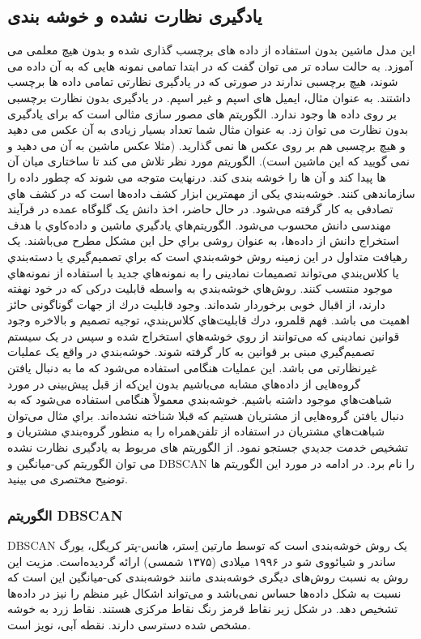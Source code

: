 \documentclass[conference]{IEEEtran}
\begin{document}
        \subsection{ یادگیری نظارت نشده و خوشه بندی   } 
این مدل ماشین بدون استفاده از داده های برچسب گذاری شده و بدون هیچ معلمی می آموزد. به حالت ساده تر می توان گفت که در ابتدا تمامی نمونه هایی که به آن داده می شوند، هیچ برچسبی ندارند در صورتی که در یادگیری نظارتی تمامی داده ها برچسب داشتند. به عنوان مثال، ایمیل های اسپم و غیر اسپم. در یادگیری بدون نظارت برچسبی بر روی داده ها وجود ندارد.
الگوریتم های مصور سازی  مثالی است که برای یادگیری بدون نظارت می توان زد. به عنوان مثال شما تعداد بسیار زیادی به آن عکس می دهید و هیچ برچسبی هم بر روی عکس ها نمی گذارید. (مثلا عکس ماشین به آن می دهید و نمی گویید که این ماشین است). الگوریتم مورد نظر تلاش می کند تا ساختاری میان آن ها پیدا کند و آن ها را خوشه بندی کند. درنهایت متوجه می شوند که چطور داده را سازماندهی کنند.
خوشه‌بندي یکی از مهمترین ابزار کشف داده‌ها است که در کشف هاي تصادفی به کار گرفته می‌شود. در حال حاضر، اخذ دانش یک گلوگاه عمده در فرآیند مهندسی دانش محسوب می‌شود. الگوریتم‌هاي یادگیري ماشین و داده‌کاوي با هدف استخراج دانش از داده‌ها، به عنوان روشی براي حل این مشکل مطرح می‌باشند. یک رهیافت متداول در این زمینه روش خوشه‌بندي است که براي تصمیم‌گیري یا دسته‌بندي یا کلاس‌بندي می‌تواند تصمیمات نمادینی را به نمونه‌هاي جدید با استفاده از نمونه‌هاي موجود منتسب کنند. روش‌هاي خوشه‌بندي به واسطه قابلیت درکی که در خود نهفته دارند، از اقبال خوبی برخوردار شده‌اند. وجود قابلیت درك از جهات گوناگونی حائز اهمیت می باشد. فهم قلمرو، درك قابلیت‌هاي کلاس‌بندي، توجیه تصمیم و بالاخره وجود قوانین نمادینی که می‌توانند از روي خوشه‌هاي استخراج شده و سپس در یک سیستم تصمیم‌گیري مبنی بر قوانین به کار گرفته شوند.
خوشه‌بندي در واقع یک عملیات غیر‌نظارتی می باشد. این عملیات هنگامی استفاده می‌شود که ما به دنبال یافتن گروه‌هایی از داده‌هاي مشابه می‌باشیم بدون این‌که از قبل پیش‌بینی در مورد شباهت‌هاي موجود داشته باشیم. خوشه‌بندي معمولاً هنگامی استفاده می‌شود که به دنبال یافتن گروه‌هایی از مشتریان هستیم که قبلا شناخته نشده‌اند. براي مثال می‌توان شباهت‌هاي مشتریان در استفاده از تلفن‌همراه را به منظور گروه‌بندي مشتریان و تشخیص خدمت جدیدي جستجو نمود.
از الگوریتم های مربوط به یادگیری نظارت نشده می توان الگوریتم کی-میانگین   و DBSCAN را نام برد. در ادامه در مورد این الگوریتم ها توضیح مختصری می بینید. 

        \subsubsection{ الگوریتم DBSCAN  } 
DBSCAN یک روش خوشه‌بندی  است که توسط مارتین اِستر، هانس-پتر کریگل، یورگ ساندر و شیائووی شو در ۱۹۹۶ میلادی (۱۳۷۵ شمسی) ارائه گردیده‌است. مزیت این روش به نسبت روش‌های دیگری خوشه‌بندی مانند خوشه‌بندی کی-میانگین این است که نسبت به شکل داده‌ها حساس نمی‌باشد و می‌تواند اشکال غیر منظم را نیز در داده‌ها تشخیص دهد.
 در شکل زیر نقاط قرمز رنگ نقاط مرکزی هستند. نقاط زرد به خوشه مشخص شده دسترسی دارند. نقطه آبی، نویز  است.
\end{document}
